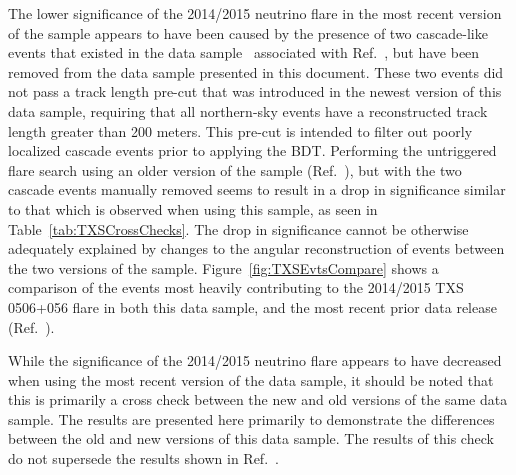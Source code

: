 \documentclass[aps,10pt,prd,twocolumn,floats,letterpaper,showpacs,nofootinbib,bibnotes,notitlepage,superscriptaddress,floatfix]{revtex4-1}
\begin{document}
The lower significance of the 2014/2015 neutrino flare in the most recent version of the sample appears to have been caused by the presence of two cascade-like events that existed in the data sample~\cite{IceCube:2019} associated with Ref.~\cite{IceCube:2018cha}, but have been removed from the data sample presented in this document. These two events did not pass a track length pre-cut that was introduced in the newest version of this data sample, requiring that all northern-sky events have a reconstructed track length greater than 200 meters. This pre-cut is intended to filter out poorly localized cascade events prior to applying the BDT. Performing the untriggered flare search using an older version of the sample (Ref.~\cite{IceCube:2019}), but with the two cascade events manually removed seems to result in a drop in significance similar to that which is observed when using this sample, as seen in Table~\ref{tab:TXSCrossChecks}. The drop in significance cannot be otherwise adequately explained by changes to the angular reconstruction of events between the two versions of the sample. Figure~\ref{fig:TXSEvtsCompare} shows a comparison of the events most heavily contributing to the 2014/2015 TXS 0506+056 flare in both this data sample, and the most recent prior data release (Ref.~\cite{IceCube:2019}). 

While the significance of the 2014/2015 neutrino flare appears to have decreased when using the most recent version of the data sample, it should be noted that this is primarily a cross check between the new and old versions of the same data sample. The results are presented here primarily to demonstrate the differences between the old and new versions of this data sample. The results of this check do not supersede the results shown in Ref.~\cite{IceCube:2018cha}.
\end{document}
